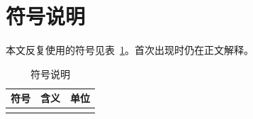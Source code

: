 \section{符号说明}

本文反复使用的符号见表~\ref{tab:symbols}。首次出现时仍在正文解释。

\begin{table}[H]
  \centering
  \caption{符号说明}
  \label{tab:symbols}
  \begin{tabularx}{\textwidth}{lXc}
    \toprule
    符号 & 含义 & 单位 \\
    \midrule
     &  &  \\
    \bottomrule
  \end{tabularx}
\end{table}
